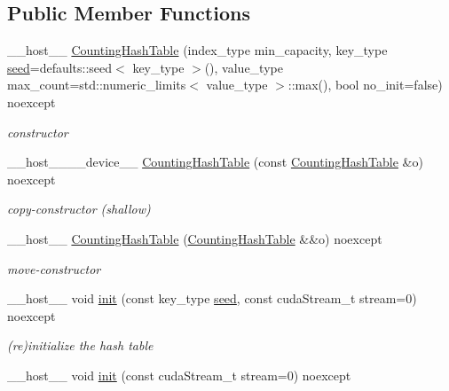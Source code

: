 \subsection*{Public Member Functions}
\begin{DoxyCompactItemize}
\item 
\+\_\+\+\_\+host\+\_\+\+\_\+ \hyperlink{classwarpcore_1_1CountingHashTable_a68946e67712e7b2afb95ddb7169a26fd}{Counting\+Hash\+Table} (index\+\_\+type min\+\_\+capacity, key\+\_\+type \hyperlink{classwarpcore_1_1CountingHashTable_a404f39442f096f294cd879b0710e5416}{seed}=defaults\+::seed$<$ key\+\_\+type $>$(), value\+\_\+type max\+\_\+count=std\+::numeric\+\_\+limits$<$ value\+\_\+type $>$\+::max(), bool no\+\_\+init=false) noexcept
\begin{DoxyCompactList}\small\item\em constructor \end{DoxyCompactList}\item 
\+\_\+\+\_\+host\+\_\+\+\_\+\+\_\+\+\_\+device\+\_\+\+\_\+ \hyperlink{classwarpcore_1_1CountingHashTable_afba99fa2513c3ca3c7708ac718d2b0fc}{Counting\+Hash\+Table} (const \hyperlink{classwarpcore_1_1CountingHashTable}{Counting\+Hash\+Table} \&o) noexcept
\begin{DoxyCompactList}\small\item\em copy-\/constructor (shallow) \end{DoxyCompactList}\item 
\+\_\+\+\_\+host\+\_\+\+\_\+ \hyperlink{classwarpcore_1_1CountingHashTable_ab1c1ea195d10fbbdb6a70e5f3bf96623}{Counting\+Hash\+Table} (\hyperlink{classwarpcore_1_1CountingHashTable}{Counting\+Hash\+Table} \&\&o) noexcept
\begin{DoxyCompactList}\small\item\em move-\/constructor \end{DoxyCompactList}\item 
\+\_\+\+\_\+host\+\_\+\+\_\+ void \hyperlink{classwarpcore_1_1CountingHashTable_acb401fb2d38c59e086a1bedf68d4815f}{init} (const key\+\_\+type \hyperlink{classwarpcore_1_1CountingHashTable_a404f39442f096f294cd879b0710e5416}{seed}, const cuda\+Stream\+\_\+t stream=0) noexcept
\begin{DoxyCompactList}\small\item\em (re)initialize the hash table \end{DoxyCompactList}\item 
\+\_\+\+\_\+host\+\_\+\+\_\+ void \hyperlink{classwarpcore_1_1CountingHashTable_a8b7a93faf9c5746c2665b4b775f9de88}{init} (const cuda\+Stream\+\_\+t stream=0) noexcept

\end{DoxyCompactItemize}
